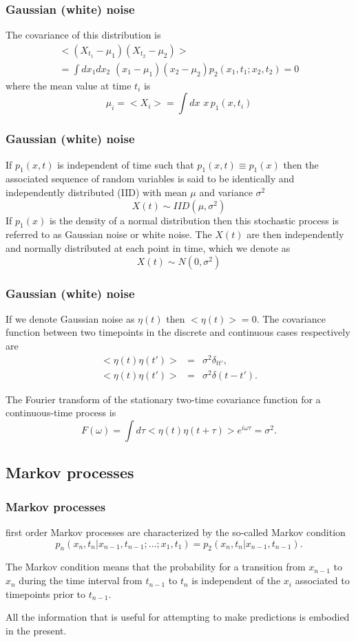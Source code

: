 \begin{frame}
\frametitle{Gaussian (white) noise}
The covariance of this distribution is
\begin{multline}
< (X_{t_1} - \mu_1)(X_{t_2} - \mu_2) > \\
= \int dx_1 dx_2 \,\, (x_1 - \mu_1)(x_2 - \mu_2)p_2(x_1,t_1;x_2,t_2) = 0
\end{multline}
where the mean value at time $t_i$ is 
$$
\mu_i = < X_i > = \int dx \,\, x \, p_1(x,t_i)
$$
\end{frame}

\begin{frame}
\frametitle{Gaussian (white) noise}
If $p_1(x,t)$ is independent of time such that $p_1(x,t) \equiv p_1(x)$ then the associated sequence of random variables is said to be identically and independently distributed (IID) with mean $\mu$ and variance $\sigma^2$
$$
X(t) \sim IID(\mu,\sigma^2)
$$
If $p_1(x)$ is the density of a normal distribution then this stochastic process is referred to as Gaussian noise or white noise. The $X(t)$ are then independently and normally distributed at each point in time, which we denote as
$$
X(t) \sim N(0,\sigma^2)
$$
\end{frame}

\begin{frame}
\frametitle{Gaussian (white) noise}
If we denote Gaussian noise as $\eta(t)$ then $< \eta(t) > = 0$. The covariance function between two timepoints in the discrete and continuous cases respectively are
\begin{eqnarray}
< \eta(t)\eta(t') > &=& \sigma^2 \delta_{tt'},\\
< \eta(t)\eta(t') > &=& \sigma^2 \delta(t-t').
\end{eqnarray}

The Fourier transform of the stationary two-time covariance function for a continuous-time process is
$$
F(\omega) = \int d \tau < \eta(t)\eta(t+\tau) > e^{i \omega \tau} = \sigma^2.
$$
\end{frame}

\subsection{Markov processes}

\begin{frame}
\frametitle{Markov processes}
first order Markov processes are characterized by the so-called Markov condition
$$
p_n(x_n,t_n | x_{n-1},t_{n-1}; \ldots ; x_1,t_1)=p_2(x_n,t_n|x_{n-1},t_{n-1}).
$$

The Markov condition means that the probability for a transition from $x_{n-1}$ to $x_n$ during the time interval from $t_{n-1}$ to $t_n$ is independent of the $x_i$ associated to timepoints prior to $t_{n-1}$.

All the information that is useful for attempting to make predictions is embodied in the present.
\end{frame}

